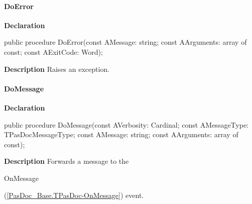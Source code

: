 \documentclass{report}
\newif\ifpdf
\begin{document}
\paragraph*{DoError}\hspace*{\fill}

\label{PasDoc_Base.TPasDoc-DoError}
\begin{list}{}{
\setlength{\itemindent}{0cm}
\setlength{\listparindent}{0cm}
\setlength{\leftmargin}{\evensidemargin}
\addtolength{\leftmargin}{\tmplength}
\settowidth{\labelsep}{X}
\addtolength{\leftmargin}{\labelsep}
\setlength{\labelwidth}{\tmplength}
}
\item[\textbf{Declaration}\hfill]
\ifpdf
\begin{flushleft}
\fi
\begin{ttfamily}
public procedure DoError(const AMessage: string; const AArguments: array of const; const AExitCode: Word);\end{ttfamily}

\ifpdf
\end{flushleft}
\fi

\par
\item[\textbf{Description}]
Raises an exception.

\end{list}
\paragraph*{DoMessage}\hspace*{\fill}

\label{PasDoc_Base.TPasDoc-DoMessage}
\begin{list}{}{
\setlength{\itemindent}{0cm}
\setlength{\listparindent}{0cm}
\setlength{\leftmargin}{\evensidemargin}
\addtolength{\leftmargin}{\tmplength}
\settowidth{\labelsep}{X}
\addtolength{\leftmargin}{\labelsep}
\setlength{\labelwidth}{\tmplength}
}
\item[\textbf{Declaration}\hfill]
\ifpdf
\begin{flushleft}
\fi
\begin{ttfamily}
public procedure DoMessage(const AVerbosity: Cardinal; const AMessageType: TPasDocMessageType; const AMessage: string; const AArguments: array of const);\end{ttfamily}

\ifpdf
\end{flushleft}
\fi

\par
\item[\textbf{Description}]
Forwards a message to the \begin{ttfamily}OnMessage\end{ttfamily}(\ref{PasDoc_Base.TPasDoc-OnMessage}) event.

\end{list}
\end{document}
